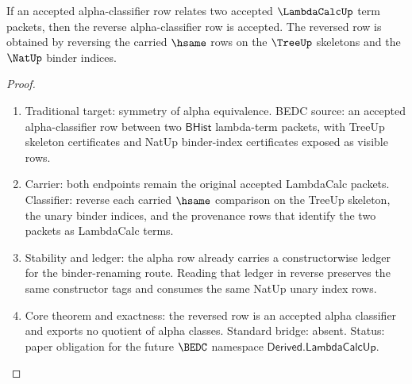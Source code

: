 \begin{theorem}
\label{thm:lambdacalc-alpha-classifier-symmetric}
If an accepted alpha-classifier row relates two accepted $\LambdaCalcUp$ term
packets, then the reverse alpha-classifier row is accepted. The reversed row is
obtained by reversing the carried $\hsame$ rows on the $\TreeUp$ skeletons and
the $\NatUp$ binder indices.
\end{theorem}
\begin{proof}
\begin{enumerate}
\item Traditional target: symmetry of alpha equivalence. BEDC source: an
accepted alpha-classifier row between two $\mathsf{BHist}$ lambda-term packets,
with TreeUp skeleton certificates and NatUp binder-index certificates exposed
as visible rows.

\item Carrier: both endpoints remain the original accepted LambdaCalc packets.
Classifier: reverse each carried $\hsame$ comparison on the TreeUp skeleton,
the unary binder indices, and the provenance rows that identify the two
packets as LambdaCalc terms.

\item Stability and ledger: the alpha row already carries a constructorwise
ledger for the binder-renaming route. Reading that ledger in reverse preserves
the same constructor tags and consumes the same NatUp unary index rows.

\item Core theorem and exactness: the reversed row is an accepted alpha
classifier and exports no quotient of alpha classes. Standard bridge: absent.
Status: paper obligation for the future $\BEDC$ namespace
$\mathsf{Derived.LambdaCalcUp}$.
\end{enumerate}
\end{proof}

